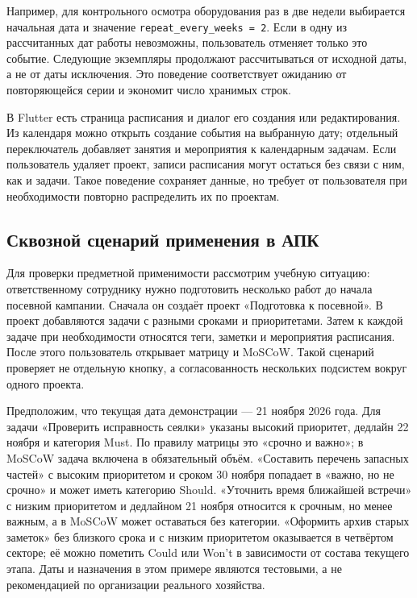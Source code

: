 \documentclass[14pt,a4paper]{extarticle}
\begin{document}
Например, для контрольного осмотра оборудования раз в две недели выбирается начальная дата и значение \texttt{repeat\_every\_weeks\ =\ 2}. Если в одну из рассчитанных дат работы невозможны, пользователь отменяет только это событие. Следующие экземпляры продолжают рассчитываться от исходной даты, а не от даты исключения. Это поведение соответствует ожиданию от повторяющейся серии и экономит число хранимых строк.

В Flutter есть страница расписания и диалог его создания или редактирования. Из календаря можно открыть создание события на выбранную дату; отдельный переключатель добавляет занятия и мероприятия к календарным задачам. Если пользователь удаляет проект, записи расписания могут остаться без связи с ним, как и задачи. Такое поведение сохраняет данные, но требует от пользователя при необходимости повторно распределить их по проектам.

\subsection{Сквозной сценарий применения в АПК}

Для проверки предметной применимости рассмотрим учебную ситуацию: ответственному сотруднику нужно подготовить несколько работ до начала посевной кампании. Сначала он создаёт проект «Подготовка к посевной». В проект добавляются задачи с разными сроками и приоритетами. Затем к каждой задаче при необходимости относятся теги, заметки и мероприятия расписания. После этого пользователь открывает матрицу и MoSCoW. Такой сценарий проверяет не отдельную кнопку, а согласованность нескольких подсистем вокруг одного проекта.

Предположим, что текущая дата демонстрации --- 21 ноября 2026 года. Для задачи «Проверить исправность сеялки» указаны высокий приоритет, дедлайн 22 ноября и категория Must. По правилу матрицы это «срочно и важно»; в MoSCoW задача включена в обязательный объём. «Составить перечень запасных частей» с высоким приоритетом и сроком 30 ноября попадает в «важно, но не срочно» и может иметь категорию Should. «Уточнить время ближайшей встречи» с низким приоритетом и дедлайном 21 ноября относится к срочным, но менее важным, а в MoSCoW может оставаться без категории. «Оформить архив старых заметок» без близкого срока и с низким приоритетом оказывается в четвёртом секторе; её можно пометить Could или Won't в зависимости от состава текущего этапа. Даты и назначения в этом примере являются тестовыми, а не рекомендацией по организации реального хозяйства.
\end{document}
